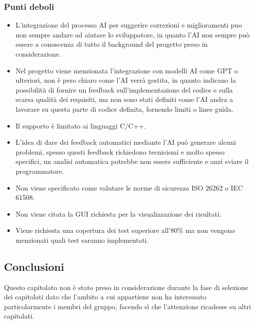     \subsubsection{Punti deboli}
   \begin{itemize}
    \item L’integrazione del processo AI per suggerire correzioni e miglioramenti puo non sempre andare ad aiutare lo sviluppatore, in quanto l’AI non sempre può essere a conoscenza di tutto il background del progetto preso in considerazione.
    \item Nel progetto viene menzionata l’integrazione con modelli AI come GPT o ulteriori, non è pero chiaro come l’AI verrà gestita, in quanto indicano la possibilità di fornire un feedback sull’implementazione del codice e sulla scarsa qualità dei requisiti, ma non sono stati definiti come l’AI andra a lavorare su questa parte di codice definita, fornendo limiti o linee guida.
    \item Il supporto è limitato ai linguaggi C/C++.
    \item L’idea di  dare dei feedback automatici mediante l’AI può generare alcuni problemi, spesso questi feedback richiedono tecnicismi e molto spesso specifici, un analisi automatica potrebbe non essere sufficiente e anzi sviare il programmatore.
    \item Non viene specificato come valutare le norme di sicurezza  ISO 26262 o IEC 61508.
    \item Non viene citata la GUI richiesta per la visualizzazione dei risultati.
    \item  Viene richiesta una copertura dei test superiore all’80\% ma non vengono menzionati quali test saranno implementati.
\end{itemize}
    \subsection{Conclusioni}
   Questo capitolato non è stato preso in considerazione durante la fase di selezione dei capitolati dato che l’ambito a cui appartiene non ha interessato particolarmente i membri del gruppo, facendo sì che l’attenzione ricadesse su altri capitolati.

